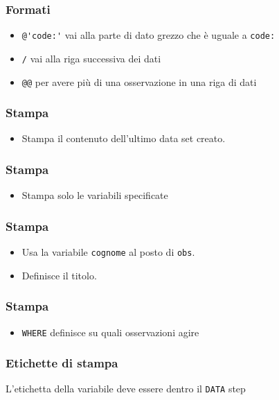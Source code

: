 \begin{frame}[containsverbatim]\frametitle{Formati}
  \begin{itemize}
  \item
    \verb!@'code:'! vai alla parte di dato grezzo che {\`e} uguale a \verb!code:!
  \item
    \verb!/! vai alla riga successiva dei dati
  \item
    \verb!@@! per avere pi{\`u} di una osservazione in una riga di dati
  \end{itemize}
\end{frame}


\begin{frame}[containsverbatim]\frametitle{Stampa}
  \begin{itemize}
  \item
    Stampa il contenuto dell'ultimo data set creato.
  \end{itemize}\end{frame}

\begin{frame}[containsverbatim]\frametitle{Stampa}
  \begin{itemize}
  \item
    Stampa solo le variabili specificate
  \end{itemize}\end{frame}

\begin{frame}[containsverbatim]\frametitle{Stampa}
  \begin{itemize}
  \item
    Usa la variabile \texttt{cognome} al posto di \texttt{obs}.
  \item
    Definisce il titolo.
  \end{itemize}\end{frame}

\begin{frame}[containsverbatim]\frametitle{Stampa}
  \begin{itemize}
  \item
    \verb+WHERE+ definisce su quali osservazioni agire
  \end{itemize}\end{frame}

\begin{frame}[containsverbatim]\frametitle{Etichette di stampa}

  \vspace{1em}
  L'etichetta della variabile deve essere dentro il \verb!DATA! step
\end{frame}





